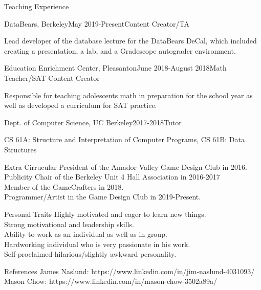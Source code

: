 \documentclass{resume} %
\begin{document}
\begin{rSection}{Teaching Experience} 
\begin{rSubsection}{DataBears, Berkeley}{May 2019-Present}{Content Creator/TA}{}
\item Lead developer of the database lecture for the DataBears DeCal, which included creating a presentation, a lab, and a Gradescope autograder environment.
\end{rSubsection}

\begin{rSubsection}{Education Enrichment Center, Pleasanton}{June 2018-August 2018}{Math Teacher/SAT Content Creator}{}
\item Responsible for teaching adolescents math in preparation for the school year as well as developed a curriculum for SAT practice.
\end{rSubsection}

\begin{rSubsection}{Dept. of Computer Science, UC Berkeley}{2017-2018}{Tutor}{}
\item CS 61A: Structure and Interpretation of Computer Programs, CS 61B: Data Structures
\end{rSubsection}
\end{rSection}

\newpage

\begin{rSection}{Extra-Cirrucular} \itemsep -3pt
President of the Amador Valley Game Design Club in 2016. \\
Publicity Chair of the Berkeley Unit 4 Hall Association in 2016-2017 \\
Member of the GameCrafters in 2018. \\
Programmer/Artist in the Game Design Club in 2019-Present.
\end{rSection}

\begin{rSection}{Personal Traits}
Highly motivated and eager to learn new things. \\
Strong motivational and leadership skills. \\
Ability to work as an individual as well as in group. \\
Hardworking individual who is very passionate in his work. \\
Self-proclaimed hilarious/slightly awkward personality.
\end{rSection}

\begin{rSection}{References}
James Naslund: https://www.linkedin.com/in/jim-naslund-4031093/ \\
Mason Chow: https://www.linkedin.com/in/mason-chow-3502a89a/
\end{rSection}
\end{document}
